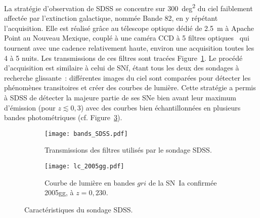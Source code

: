 \documentclass[../main/main.tex]{subfiles}
\begin{document}
La stratégie d'observation de SDSS se concentre sur \SI{300}{deg^2} du ciel
faiblement affectée par l'extinction galactique, nommée Bande 82, en y répétant
l'acquisition. Elle est réalisé grâce au télescope optique dédié de \SI{2,5}{m}
\citep{gunn2006} à Apache Point au Nouveau Mexique, couplé à une caméra CCD
\citep{gunn1998} à 5 filtres optiques~\citep[$ugriz$,][]{fukugita1996} qui
tournent avec une cadence relativement haute, environ une acquisition toutes les
4 à 5 nuits. Les transmissions de ces filtres sont tracées
Figure~\ref{fig:sdssbands}. Le procédé d'acquisition est similaire à celui de
SNf, étant tous les deux des sondages à recherche glissante~: différentes images
du ciel sont comparées pour détecter les phénomènes transitoires et créer des
courbes de lumière. Cette stratégie a permis à SDSS de détecter la majeure
partie de ses SNe bien avant leur maximum d'émission (pour $z \lesssim 0,3$)
avec des courbes bien échantillonnées en plusieurs bandes photométriques (cf.
Figure~\ref{fig:sdsslc}).

\begin{figure}[ht]
    \centering
    \begin{subfigure}[]{.49\linewidth}
        \centering
        \texttt{[image: bands\_SDSS.pdf]}
        \captionsetup{justification=centering}
        \caption{Transmissions des filtres utilisés par le sondage SDSS.}
        \label{fig:sdssbands}
    \end{subfigure}
    \begin{subfigure}[]{.49\linewidth}
        \centering
        \texttt{[image: lc\_2005gg.pdf]}
        \captionsetup{justification=centering}
        \caption{Courbe de lumière en bandes $gri$ de la SN~Ia
            confirmée 2005gg, à $z = 0,230$.}
        \label{fig:sdsslc}
    \end{subfigure}
    \caption{Caractéristiques du sondage SDSS.}
\end{figure}

% 
\end{document}
